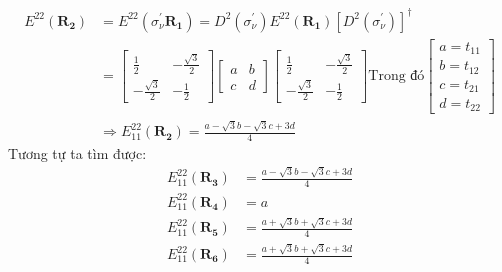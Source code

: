 \documentclass{article}
\begin{document}
\begin{align*}
    E^{22} (\mathbf{R_2}) & = E^{22}(\sigma_\nu^{'} \mathbf{R_1}) = D^2(\sigma^{'}_\nu) E^{22} (\mathbf{R_1}) [D^2(\sigma_\nu ^{'})]^\dagger \\
                          & =
    \begin{bmatrix}
        \frac{1}{2}         & -\frac{\sqrt{3}}{2} \\
        -\frac{\sqrt{3}}{2} & -\frac{1}{2}
    \end{bmatrix} \begin{bmatrix}
                      a & b \\
                      c & d
                  \end{bmatrix}\begin{bmatrix}
                                   \frac{1}{2}         & -\frac{\sqrt{3}}{2} \\
                                   -\frac{\sqrt{3}}{2} & -\frac{1}{2}
                               \end{bmatrix}\text{Trong đó}\begin{bmatrix}
                                                               a = t_{11} \\
                                                               b = t_{12} \\
                                                               c = t_{21} \\
                                                               d = t_{22}
                                                           \end{bmatrix}                                                      \\
                          & \Rightarrow E^{22}_{11} (\mathbf{R_2}) = \frac{a - \sqrt{3}b - \sqrt{3}c + 3d}{4}
\end{align*}
Tương tự ta tìm được:
\begin{align*}
    E^{22}_{11} (\mathbf{R_3}) & = \frac{a - \sqrt{3}b - \sqrt{3}c + 3d}{4} \\
    E^{22}_{11} (\mathbf{R_4}) & = a                                        \\
    E^{22}_{11} (\mathbf{R_5}) & = \frac{a + \sqrt{3}b + \sqrt{3}c + 3d}{4} \\
    E^{22}_{11} (\mathbf{R_6}) & = \frac{a + \sqrt{3}b + \sqrt{3}c + 3d}{4} \\
\end{align*}
\end{document}
